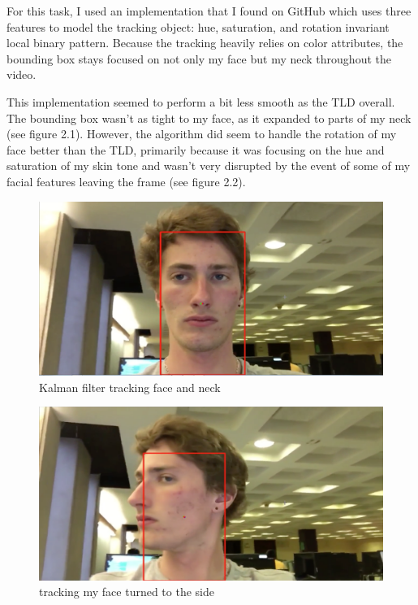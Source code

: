 \documentclass[paper=a4, fontsize=11pt]{scrartcl} %
\numberwithin{equation}{section} %
\numberwithin{figure}{section} %
\numberwithin{table}{section} %
\begin{document}
For this task, I used an implementation that I found on GitHub which uses three features to model the tracking object: hue, saturation, and rotation invariant local binary pattern. Because the tracking heavily relies on color attributes, the bounding box stays focused on not only my face but my neck throughout the video.

This implementation seemed to perform a bit less smooth as the TLD overall. The bounding box wasn't as tight to my face, as it expanded to parts of my neck (see figure 2.1). However, the algorithm did seem to handle the rotation of my face better than the TLD, primarily because it was focusing on the hue and saturation of my skin tone and wasn't very disrupted by the event of some of my facial features leaving the frame (see figure 2.2).

\begin{figure}[H]
  \centering
  \begin{minipage}[b]{0.7\textwidth}
    \includegraphics[width=\textwidth]{kalman_1.png}
    \caption{Kalman filter tracking face and neck}
  \end{minipage}
\end{figure}

\begin{figure}[H]
  \centering
  \begin{minipage}[b]{0.7\textwidth}
    \includegraphics[width=\textwidth]{kalman_2.png}
    \caption{tracking my face turned to the side}
  \end{minipage}
\end{figure}
\end{document}
